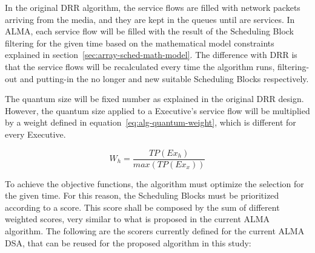 In the original DRR algorithm, the service flows are filled with network packets arriving from the media, and they are kept in the queues until are services. In ALMA, each service flow will be filled with the result of the Scheduling Block filtering for the given time based on the mathematical model constraints explained in section~\ref{sec:array-sched-math-model}. The difference with DRR is that the service flows will be recalculated every time the algorithm runs, filtering-out and putting-in the no longer and new suitable Scheduling Blocks respectively.

The quantum size will be fixed number as explained in the original DRR design. However, the quantum size applied to a Executive's service flow will be multiplied by a weight defined in equation~\ref{eq:alg-quantum-weight}, which is different for every Executive.

\begin{equation}
\label{eq:alg-quantum-weight}
W_{h} = \frac{TP(Ex_h)}{max(TP(Ex_x))}
\end{equation}

To achieve the objective functions, the algorithm must optimize the selection for the given time. For this reason, the Scheduling Blocks must be prioritized according to a score. This score shall be composed by the sum of different weighted scores, very similar to what is proposed in the current ALMA algorithm. The following are the scorers currently defined for the current ALMA DSA, that can be reused for the proposed algorithm in this study:

